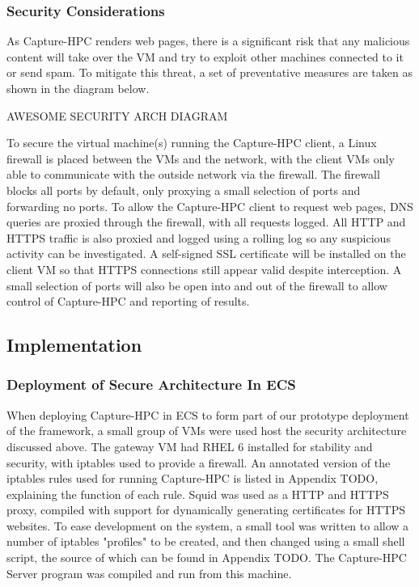 \subsubsection{Security Considerations}

As Capture-HPC renders web pages, there is a significant risk that any malicious
content will take over the VM and try to exploit other machines connected to it
or send spam. To mitigate this threat, a set of preventative measures are taken
as shown in the diagram below.

AWESOME SECURITY ARCH DIAGRAM

To secure the virtual machine(s) running the Capture-HPC client, a Linux
firewall is placed between the VMs and the network, with the client VMs only
able to communicate with the outside network via the firewall. The firewall
blocks all ports by default, only proxying a small selection of ports and
forwarding no ports. To allow the Capture-HPC client to request web pages, DNS
queries are proxied through the firewall, with all requests logged. All HTTP and
HTTPS traffic is also proxied and logged using a rolling log so any suspicious
activity can be investigated. A self-signed SSL certificate will be installed on
the client VM so that HTTPS connections still appear valid despite interception.
A small selection of ports will also be open into and out of the firewall to
allow control of Capture-HPC and reporting of results.

\subsection{Implementation}

\subsubsection{Deployment of Secure Architecture In ECS}


When deploying Capture-HPC in ECS to form part of our prototype deployment of
the framework, a small group of VMs were used host the security architecture
discussed above. The gateway VM had RHEL 6 installed for stability and security,
with iptables used to provide a firewall. An annotated version of the iptables
rules used for running Capture-HPC is listed in Appendix TODO, explaining the
function of each rule. Squid was used as a HTTP and HTTPS proxy, compiled with
support for dynamically generating certificates for HTTPS websites. To ease 
development on the system, a small tool was written to allow a number of
iptables "profiles" to be created, and then changed using a small shell script,
the source of which can be found in Appendix TODO. The Capture-HPC Server
program was compiled and run from this machine.

